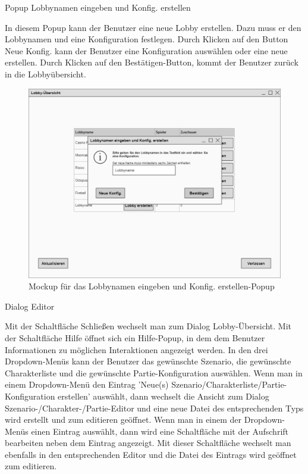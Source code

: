 Popup \glqq{}Lobbynamen eingeben und Konfig. erstellen\grqq{}

In diesem Popup kann der Benutzer eine neue Lobby erstellen. Dazu muss er den Lobbynamen und eine Konfiguration festlegen. Durch Klicken auf den Button Neue Konfig. kann der Benutzer eine Konfiguration auswählen oder eine neue erstellen. Durch Klicken auf den Bestätigen-Button, kommt der Benutzer zurück in die Lobbyübersicht.

\begin{figure}[H]
  \centering
  \includegraphics[width=\textwidth]{Meilenstein03/LobbynamenEingebenUndKonfigErstellen_Mockup.png}
  \caption{Mockup für das Lobbynamen eingeben und Konfig. erstellen-Popup}
\end{figure}

Dialog \glqq{}Editor\grqq{}

Mit der Schaltfläche \glqq{}Schließen\grqq{} wechselt man zum Dialog \glqq{}Lobby-Übersicht\grqq{}.
Mit der Schaltfläche \glqq{}Hilfe\grqq{} öffnet sich ein Hilfe-Popup, in dem dem Benutzer Informationen zu möglichen Interaktionen angezeigt werden.
In den drei Dropdown-Menüs kann der Benutzer das gewünschte Szenario, die gewünschte Charakterliste und die gewünschte Partie-Konfiguration auswählen. Wenn man in einem Dropdown-Menü den Eintrag 'Neue(s) Szenario/Charakterliste/Partie-Konfiguration erstellen' auswählt, dann wechselt die Ansicht zum Dialog \glqq{}Szenario-/Charakter-/Partie-Editor\grqq{} und eine neue Datei des entsprechenden Typs wird erstellt und zum editieren geöffnet.
Wenn man in einem der Dropdown-Menüs einen Eintrag auswählt, dann wird eine Schaltfläche mit der Aufschrift \glqq{}bearbeiten\grqq{} neben dem Eintrag angezeigt. Mit dieser Schaltfläche wechselt man ebenfalls in den entsprechenden Editor und die Datei des Eintrags wird geöffnet zum editieren.

